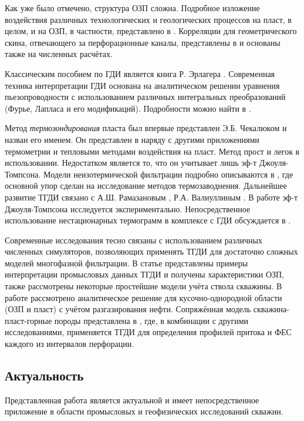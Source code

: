	Как уже было отмечено, структура ОЗП сложна. Подробное изложение воздействия различных технологических и геологических процессов на пласт, в целом, и на ОЗП, в частности, представлено в \cite{civan}. Корреляции для геометрического скина, отвечающего за перфорационные каналы, представлены в \cite{tariq} и основаны также на численных расчётах.
	
	Классическим пособием по ГДИ является книга Р. Эрлагера \cite{erlauger}.
	Современная техника интерпретации ГДИ основана на аналитическом решении уравнения пьезопроводности с использованием различных интегральных преобразований (Фурье, Лапласа и его модификаций). Подробности можно найти в \cite{kappa}.
	
	
	Метод \textit{термозондирования} пласта был впервые представлен Э.Б. Чекалюком и назван его именем.
	Он представлен в \cite{checkalyuk} наряду с другими приложениями термометрии и тепловыми методами воздействия на пласт.
	Метод прост и легок в использовании. Недостатком является то, что он учитывает лишь эф-т Джоуля-Томпсона.
	Модели неизотермической фильтрации подробно описываются в \cite{alishaev}, где основной упор сделан на исследование методов термозаводнения.
	Дальнейшее развитие ТГДИ связано с А.Ш. Рамазановым \cite{ramazanov_diss}, Р.А. Валиуллиным \cite{valiullin}.
	В работе \cite{ramazanov_old1} эф-т Джоуля-Томпсона исследуется экспериментально.
	Непосредственное использование нестационарных термограмм в комплексе с ГДИ обсуждается в \cite{ramazanov_old2}.
	
	Современные исследования тесно связаны с использованием различных численных симуляторов, позволяющих применять ТГДИ для достаточно сложных моделей многофазной фильтрации. В статье \cite{ramazanov_spe} представлены примеры интерпретации промысловых данных ТГДИ и получены характеристики ОЗП, также рассмотрены некоторые простейшие модели учёта ствола скважины. 
	В работе \cite{ramazanov_main} рассмотрено аналитическое решение для кусочно-однородной области (ОЗП и пласт) с учётом разгазирования нефти.
	Сопряжённая модель скважина-пласт-горные породы представлена в \cite{ramazanov_spe1}, где, в комбинации с другими исследованиями, применяется ТГДИ для определения профилей притока и ФЕС каждого из интервалов перфорации.
	
\subsection*{Актуальность}
	Представленная работа является актуальной и имеет непосредственное приложение в области промысловых и геофизических исследований скважин.

